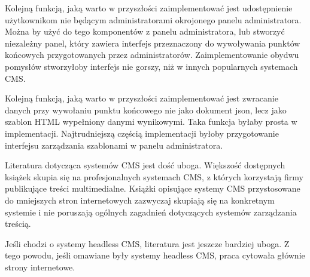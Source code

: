 Kolejną funkcją, jaką warto w przyszłości zaimplementować jest udostępnienie
użytkownikom nie będącym administratorami okrojonego panelu administratora.
Można by użyć do tego komponentów z panelu administratora, lub stworzyć
niezależny panel, który zawiera interfejs przeznaczony do wywoływania punktów
końcowych przygotowanych przez administratorów. Zaimplementowanie obydwu
pomysłów stworzyłoby interfejs nie gorszy, niż w innych popularnych systemach
CMS.

Kolejną funkcją, jaką warto w przyszłości zaimplementować jest zwracanie danych
przy wywołaniu punktu końcowego nie jako dokument json, lecz jako szablon HTML
wypełniony danymi wynikowymi. Taka funkcja byłaby prosta w implementacji.
Najtrudniejszą częścią implementacji byłoby przygotowanie interfejsu zarządzania
szablonami w panelu administratora.

\medspace

Literatura dotycząca systemów CMS jest dość uboga. Większość dostępnych książek
skupia się na profesjonalnych systemach CMS, z których korzystają firmy
publikujące treści multimedialne. Książki opisujące systemy CMS przystosowane do
mniejszych stron internetowych zazwyczaj skupiają się na konkretnym systemie i
nie poruszają ogólnych zagadnień dotyczących systemów zarządzania treścią.

Jeśli chodzi o systemy headless CMS, literatura jest jeszcze bardziej uboga. Z
tego powodu, jeśli omawiane były systemy headless CMS, praca cytowała głównie
strony internetowe.
